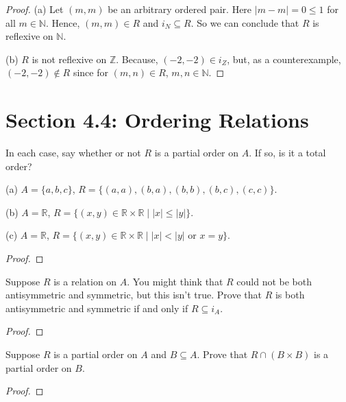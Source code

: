 \documentclass[12pt]{article}
\newenvironment{exercise}[2][Exercise]{\begin{trivlist}
\item[\hskip \labelsep {\bfseries #1}\hskip \labelsep {\bfseries #2.}]}{\end{trivlist}}
\begin{document}
\begin{proof}
	(a) Let $(m,m)$ be an arbitrary ordered pair. Here $\lvert m-m \rvert=0\leq 1$ for all $m\in \mathbb{N}$. Hence, $(m,m)\in R$ and $i_{N} \subseteq R$. So we can conclude that $R$ is reflexive on $\mathbb{N}$.
	
	(b) $R$ is not reflexive on $\mathbb{Z}$. Because, $(-2,-2)\in i_{Z} $, but, as a counterexample, $(-2,-2)\notin R$ since for $(m,n)\in R$, $m,n \in \mathbb{N}$. 
\end{proof}

\section{Section 4.4: Ordering Relations}

\begin{exercise}
	{1}
	In each case, say whether or not \( R \) is a partial order on \( A \). If so, is it a total order?

(a) \( A = \{a, b, c\} \), \( R = \{(a, a), (b, a), (b, b), (b, c), (c, c)\} \).

(b) \( A = \mathbb{R} \), \( R = \{(x, y) \in \mathbb{R} \times \mathbb{R} \mid |x| \leq |y|\} \).

(c) \( A = \mathbb{R} \), \( R = \{(x, y) \in \mathbb{R} \times \mathbb{R} \mid |x| < |y| \text{ or } x = y\} \).
\end{exercise}

\begin{proof}
	
\end{proof}

\begin{exercise}
	{4}
	Suppose \( R \) is a relation on \( A \). You might think that \( R \) could not be both antisymmetric and symmetric, but this isn’t true. Prove that \( R \) is both antisymmetric and symmetric if and only if \( R \subseteq i_A \).
\end{exercise}

\begin{proof}
	
\end{proof}

\begin{exercise}
	{5}
	Suppose \( R \) is a partial order on \( A \) and \( B \subseteq A \). Prove that \( R \cap (B \times B) \) is a partial order on \( B \).
\end{exercise}

\begin{proof}
	
\end{proof}
\end{document}
